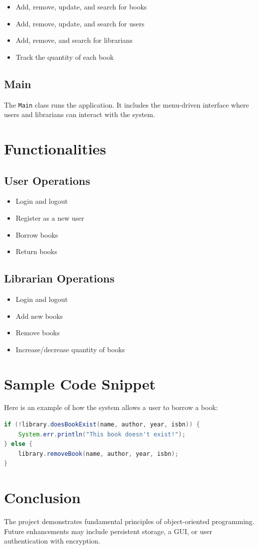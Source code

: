\documentclass[a4paper,12pt]{article}
\begin{document}
\begin{itemize}
    \item Add, remove, update, and search for books
    \item Add, remove, update, and search for users
    \item Add, remove, and search for librarians
    \item Track the quantity of each book
\end{itemize}

\subsection{Main}
The \texttt{Main} class runs the application. It includes the menu-driven interface where users and librarians can interact with the system.

\section{Functionalities}

\subsection{User Operations}
\begin{itemize}
    \item Login and logout
    \item Register as a new user
    \item Borrow books
    \item Return books
\end{itemize}

\subsection{Librarian Operations}
\begin{itemize}
    \item Login and logout
    \item Add new books
    \item Remove books
    \item Increase/decrease quantity of books
\end{itemize}

\section{Sample Code Snippet}
Here is an example of how the system allows a user to borrow a book:
\begin{lstlisting}[language=Java, basicstyle=\ttfamily\small, keywordstyle=\color{blue}]
if (!library.doesBookExist(name, author, year, isbn)) {
    System.err.println("This book doesn't exist!");
} else {
    library.removeBook(name, author, year, isbn);
}
\end{lstlisting}

\section{Conclusion}
The project demonstrates fundamental principles of object-oriented programming. Future enhancements may include persistent storage, a GUI, or user authentication with encryption.
\end{document}
